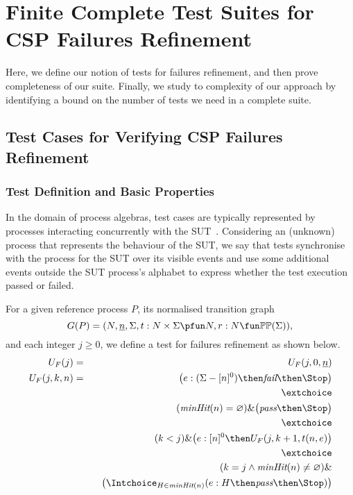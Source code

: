 \section{Finite Complete Test Suites for CSP Failures Refinement}
\label{sec:finitecompletefails}

Here, we define our notion of tests for failures refinement, and then prove
completeness of our suite. Finally, we study to complexity of our approach by
identifying a bound on the number of tests we need in a complete suite.

\subsection{Test Cases for Verifying CSP Failures Refinement}

\subsubsection*{Test Definition and Basic Properties}

In the domain of process algebras, test cases are typically represented by
processes interacting concurrently with the
SUT~\cite{Hennessy:1988:ATP:50497}. Considering an (unknown) process that
represents the behaviour of the SUT, we say that tests synchronise with the
process for the SUT over its visible events and use some additional events
outside the SUT process's alphabet to express whether the test execution
passed or failed.

For a given reference process $P$, its normalised transition graph
$$
G(P) = ( N, \ii n, \Sigma, t : N\times\Sigma \pfun N, r : N \fun \mathbb{P}\mathbb{P}(\Sigma)),
$$
and each integer $j\ge 0$, we define a test for failures refinement as shown
below.
%
\begin{eqnarray}
\label{eq:UFP}
U_F(j) & = & U_F(j,0,\ii n)
\\
U_F(j,k,n) & = & \big(e:(\Sigma - [n]^0)  \then \efail\then \Stop \big)
\label{eq:ufa}
\\ & & \extchoice \nonumber
\\ & & (\minhits(n) =   \varnothing  )    \&   \big( \epass \then \Stop \big)
\label{eq:ufb}
\\ & & \extchoice \nonumber
\\ & & (k < j) \& \big(e:[n]^0   \then U_F(j,k+1,t(n,e) \big)
\label{eq:ufc}
\\ & & \extchoice \nonumber
\\ & & (k = j \wedge \minhits(n)\neq\varnothing) \&  \nonumber
\\ & & \taba \big( \Intchoice_{H\in\minhits(n)} (e:H   \then \epass \then\Stop   )  \big)
\label{eq:ufd}
\end{eqnarray}

